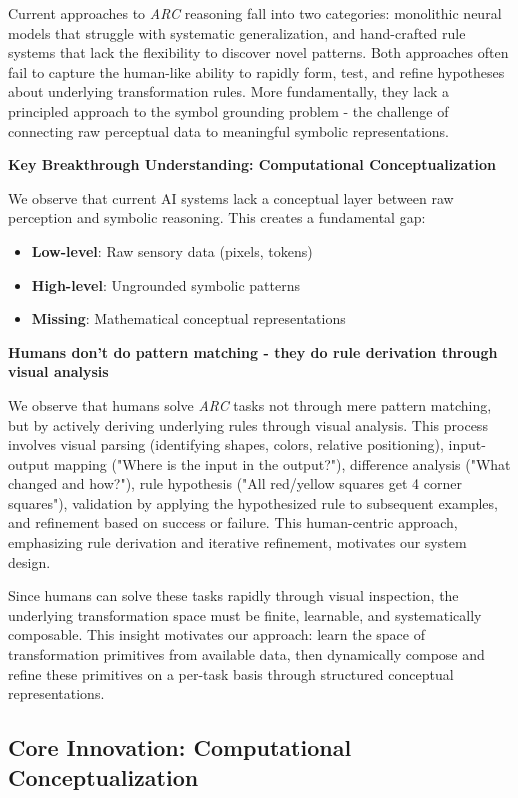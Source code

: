 \documentclass[12pt]{article}
\newcommand{\arc}{\textit{ARC}}
\begin{document}
Current approaches to \arc{} reasoning fall into two categories: monolithic neural models that struggle with systematic generalization, and hand-crafted rule systems that lack the flexibility to discover novel patterns. Both approaches often fail to capture the human-like ability to rapidly form, test, and refine hypotheses about underlying transformation rules. More fundamentally, they lack a principled approach to the symbol grounding problem - the challenge of connecting raw perceptual data to meaningful symbolic representations.

\textbf{Key Breakthrough Understanding: Computational Conceptualization}

We observe that current AI systems lack a conceptual layer between raw perception and symbolic reasoning. This creates a fundamental gap:
\begin{itemize}[noitemsep,topsep=0pt]
\item \textbf{Low-level}: Raw sensory data (pixels, tokens)
\item \textbf{High-level}: Ungrounded symbolic patterns
\item \textbf{Missing}: Mathematical conceptual representations
\end{itemize}

\textbf{Humans don't do pattern matching - they do rule derivation through visual analysis}

We observe that humans solve \arc{} tasks not through mere pattern matching, but by actively deriving underlying rules through visual analysis. This process involves visual parsing (identifying shapes, colors, relative positioning), input-output mapping ("Where is the input in the output?"), difference analysis ("What changed and how?"), rule hypothesis ("All red/yellow squares get 4 corner squares"), validation by applying the hypothesized rule to subsequent examples, and refinement based on success or failure. This human-centric approach, emphasizing rule derivation and iterative refinement, motivates our system design.

Since humans can solve these tasks rapidly through visual inspection, the underlying transformation space must be finite, learnable, and systematically composable. This insight motivates our approach: learn the space of transformation primitives from available data, then dynamically compose and refine these primitives on a per-task basis through structured conceptual representations.

\subsection{Core Innovation: Computational Conceptualization}
\end{document}
